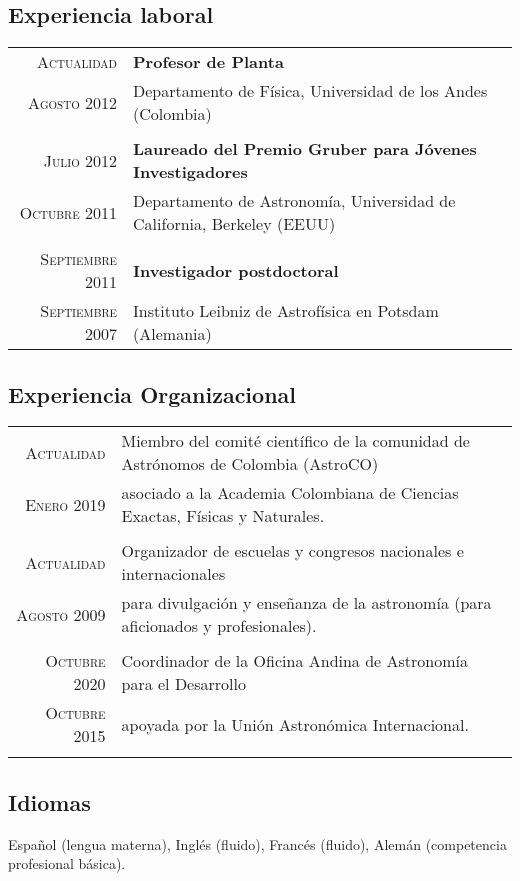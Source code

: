 \documentclass[a4paper,10pt]{article} %
\begin{document}
\color{red}
\subsection{Experiencia laboral}
\color{black}

\begin{tabular}{rl}	
 \textsc{Actualidad} &  {\bf Profesor de Planta}\\
 \textsc{Agosto 2012} & Departamento de Física, Universidad de los Andes (Colombia) \\
&\\
 \textsc{Julio 2012} &  {\bf Laureado del Premio Gruber para Jóvenes Investigadores}\\
 \textsc{Octubre 2011} & Departamento de Astronomía, Universidad de California, Berkeley (EEUU) \\
&\\
 \textsc{Septiembre 2011} &  {\bf Investigador postdoctoral}\\
 \textsc{Septiembre 2007} & Instituto Leibniz de Astrofísica en Potsdam (Alemania) \\ 
\end{tabular}



\color{red}
\subsection{Experiencia Organizacional}
\color{black}


\begin{tabular}{rl}	
\textsc{Actualidad} & Miembro del comité científico de la comunidad de Astrónomos de Colombia (AstroCO)  \\
\textsc{Enero 2019} & asociado a la Academia Colombiana de Ciencias Exactas, Físicas y Naturales.\\
& \\ 
\textsc{Actualidad} & Organizador de escuelas y congresos nacionales e internacionales\\%
\textsc{Agosto 2009} & para divulgación y enseñanza de la astronomía (para aficionados y profesionales).\\
& \\ %
  \textsc{Octubre 2020} &  Coordinador de la Oficina Andina de Astronomía para el Desarrollo\\
 \textsc{Octubre 2015} & apoyada por la Unión Astronómica Internacional.\\
& \\
\end{tabular}


\color{red}
\subsection{Idiomas}
\color{black}


Español (lengua materna), Inglés (fluido), Francés (fluido), Alemán (competencia profesional básica).
 
\end{document}
